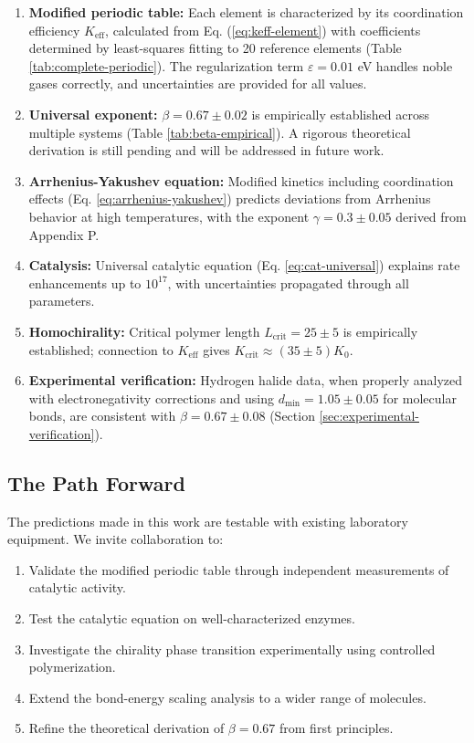 \documentclass[12pt,a4paper]{article}
\theoremstyle{remark}
\newcommand{\Keff}{K_{\mathrm{eff}}}
\newcommand{\Kcrit}{K_{\mathrm{crit}}}
\begin{document}
	\begin{enumerate}
		\item \textbf{Modified periodic table:} Each element is characterized by its coordination efficiency $\Keff$, calculated from Eq. (\ref{eq:keff-element}) with coefficients determined by least-squares fitting to 20 reference elements (Table \ref{tab:complete-periodic}). The regularization term $\varepsilon = 0.01$ eV handles noble gases correctly, and uncertainties are provided for all values.
		
		\item \textbf{Universal exponent:} $\beta = 0.67 \pm 0.02$ is empirically established across multiple systems (Table \ref{tab:beta-empirical}). A rigorous theoretical derivation is still pending and will be addressed in future work.
		
		\item \textbf{Arrhenius-Yakushev equation:} Modified kinetics including coordination effects (Eq. \ref{eq:arrhenius-yakushev}) predicts deviations from Arrhenius behavior at high temperatures, with the exponent $\gamma = 0.3 \pm 0.05$ derived from Appendix P.
		
		\item \textbf{Catalysis:} Universal catalytic equation (Eq. \ref{eq:cat-universal}) explains rate enhancements up to $10^{17}$, with uncertainties propagated through all parameters.
		
		\item \textbf{Homochirality:} Critical polymer length $L_{\text{crit}} = 25 \pm 5$ is empirically established; connection to $\Keff$ gives $\Kcrit \approx (35 \pm 5) K_0$.
		
		\item \textbf{Experimental verification:} Hydrogen halide data, when properly analyzed with electronegativity corrections and using $d_{\text{min}} = 1.05 \pm 0.05$ for molecular bonds, are consistent with $\beta = 0.67 \pm 0.08$ (Section \ref{sec:experimental-verification}).
	\end{enumerate}
	
	\subsection{The Path Forward}
	
	The predictions made in this work are testable with existing laboratory equipment. We invite collaboration to:
	\begin{enumerate}
		\item Validate the modified periodic table through independent measurements of catalytic activity.
		\item Test the catalytic equation on well-characterized enzymes.
		\item Investigate the chirality phase transition experimentally using controlled polymerization.
		\item Extend the bond-energy scaling analysis to a wider range of molecules.
		\item Refine the theoretical derivation of $\beta = 0.67$ from first principles.
	\end{enumerate}
	
\end{document}

